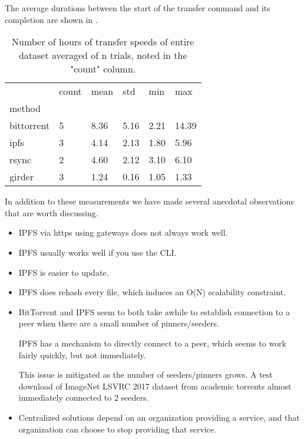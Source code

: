 \documentclass[10pt,twocolumn,letterpaper]{article}
\begin{document}
The average durations between the start of the transfer command and its
completion are shown in \cite{tab:transfertime}.

\begin{table}[t]
\begin{tabular}{llllll}
\toprule
{} & count &   mean &    std &   min &    max \\
method        &       &        &        &       &        \\
\midrule
bittorrent & 5 & 8.36 & 5.16 & 2.21 & 14.39 \\
ipfs & 3 & 4.14 & 2.13 & 1.80 & 5.96 \\
rsync & 2 & 4.60 & 2.12 & 3.10 & 6.10 \\
girder & 3 & 1.24 & 0.16 & 1.05 & 1.33 \\
\bottomrule
\end{tabular}
\label{tab:transfertime}
\caption[]{
    Number of hours of transfer speeds of entire dataset averaged of n trials,
    noted in the "count" column. 
}
\end{table}


In addition to these measurements we have made several anecdotal observations
that are worth discussing.

\begin{itemize}
    \item IPFS via https using gateways does not always work well.
    \item IPFS usually works well if you use the CLI.
    \item IPFS is easier to update.
    \item IPFS does rehash every file, which induces an O(N) scalability constraint.

    \item BitTorrent and IPFS seem to both take awhile to establish connection
          to a peer when there are a small number of pinners/seeders.

          IPFS has a mechanism to directly connect to a peer, which seems to
          work fairly quickly, but not immediately.

          This issue is mitigated as the number of seeders/pinners grows.
          A test download of ImageNet LSVRC 2017 dataset from academic torrents
          almost immediately connected to 2 seeders.

    \item Centralized solutions depend on an organization providing a service,
          and that organization can choose to stop providing that service.
\end{itemize}
\end{document}
